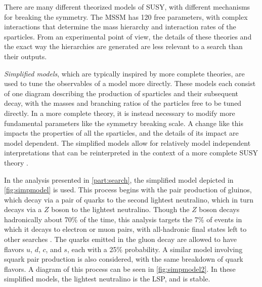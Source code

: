 There are many different theorized models of \ac{SUSY}, with different mechanisms for breaking the symmetry. The \ac{MSSM} has 120 free parameters, with complex interactions that determine the mass hierarchy and interaction rates of the sparticles. From an experimental point of view, the details of these theories and the exact way the hierarchies are generated are less relevant to a search than their outputs. 

\textit{Simplified models}, which are typically inspired by more complete theories, are used to tune the observables of a model more directly. These models each consist of one diagram describing the production of sparticles and their subsequent decay, with the masses and branching ratios of the particles free to be tuned directly. In a more complete theory, it is instead necessary to modify more fundamental parameters like the symmetry breaking scale. A change like this impacts the properties of all the sparticles, and the details of its impact are model dependent. The simplified models allow for relatively model independent interpretations that can be reinterpreted in the context of a more complete \ac{SUSY} theory \cite{1608.00872}.

In the analysis presented in \autoref{part:search}, the simplified model depicted in \autoref{fig:simpmodel} is used. This process begins with the pair production of gluinos, which decay via a pair of quarks to the second lightest neutralino, which in turn decays via a $Z$ boson to the lightest neutralino. Though the $Z$ boson decays hadronically about 70\% of the time, this analysis targets the 7\% of events in which it decays to electron or muon pairs, with all-hadronic final states left to other searches \cite{ATLAS:2016kts}. The quarks emitted in the gluon decay are allowed to have flavors $u$, $d$, $c$, and $s$, each with a 25\% probability. A similar model involving squark pair production is also considered, with the same breakdown of quark flavors. A diagram of this process can be seen in \autoref{fig:simpmodel2}. In these simplified models, the lightest neutralino is the \ac{LSP}, and is stable. 

